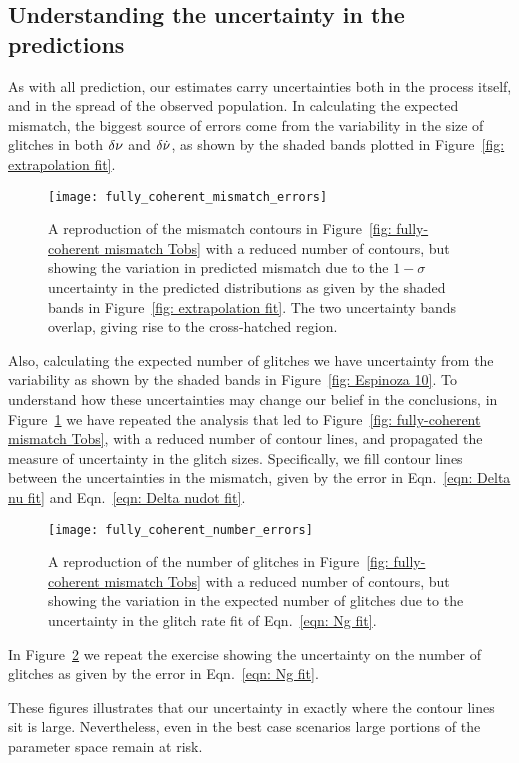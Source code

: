 \documentclass[../full_thesis/full_thesis.tex]{subfiles}
\begin{document}
\begin{subappendices}
\section{Understanding the uncertainty in the predictions}
\label{sec: uncertainties}

As with all prediction, our estimates carry uncertainties both in the process
itself, and in the spread of the observed population. In calculating the
expected mismatch, the biggest source of errors come from the variability in
the size of glitches in both $\delta\nu$ and $\delta\dot{\nu}$, as shown by the
shaded bands plotted in Figure~\ref{fig: extrapolation fit}.
\begin{figure}[htb]
\centering
\texttt{[image: fully\_coherent\_mismatch\_errors]}
\caption{A reproduction of the mismatch contours in Figure~\ref{fig:
fully-coherent mismatch Tobs} with a
reduced number of contours, but showing the variation in predicted mismatch
due to the $1-\sigma$ uncertainty in the predicted distributions as given by
the shaded bands in Figure~\ref{fig: extrapolation fit}. The two uncertainty
bands overlap, giving rise to the cross-hatched region.}
\label{fig: fully-coherent mismatch Tobs errors}
\end{figure}
Also, calculating the expected number of glitches we have
uncertainty from the variability as shown by the shaded bands in Figure~\ref{fig:
Espinoza 10}. To understand how these uncertainties may change our belief in
the conclusions, in Figure~\ref{fig: fully-coherent mismatch Tobs errors} we have
repeated the analysis that led to Figure~\ref{fig: fully-coherent mismatch Tobs},
with a reduced number of
contour lines, and propagated the measure of uncertainty in the glitch sizes.
Specifically, we fill contour lines between the uncertainties in the mismatch, given by
the error in Eqn.~\eqref{eqn: Delta nu fit} and
Eqn.~\eqref{eqn: Delta nudot fit}.
\begin{figure}[htb]
\centering
\texttt{[image: fully\_coherent\_number\_errors]}
\caption{A reproduction of the number of glitches in Figure~\ref{fig:
fully-coherent mismatch Tobs} with a
reduced number of contours, but showing the variation in the expected number
of glitches due to the uncertainty in the glitch rate fit of Eqn.~\eqref{eqn:
Ng fit}.}
\label{fig: fully-coherent number Tobs errors}
\end{figure}
In Figure~\ref{fig: fully-coherent number Tobs errors}
we repeat the exercise showing the uncertainty on the number of glitches as
given by the error in Eqn.~\eqref{eqn: Ng fit}.

These figures illustrates that our uncertainty in exactly where the contour lines
sit is large. Nevertheless, even in the best case scenarios large portions of the
parameter space remain at risk.
\end{subappendices}

\biblio
\end{document}
